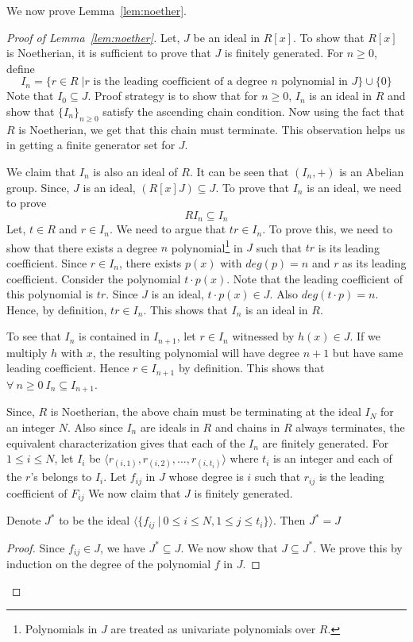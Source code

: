 We now prove Lemma~\ref{lem:noether}.
\begin{proof}[Proof of Lemma~\ref{lem:noether}]
Let, $J$ be an ideal in $R[x]$. To show that $R[x]$ is Noetherian, it is 
sufficient to prove that $J$ is finitely generated. 
For $n \ge 0$, define 
\[ I_n = \{r\in R\;| r \text{ is the leading coefficient of a degree } n
\text{ polynomial in } J\} \cup \{0\} \]
Note that $I_0 \subseteq J$. Proof strategy is to show that for $n \ge 0$,
$I_n$ is an ideal in $R$ and show that $\{I_n\}_{n \ge 0}$ satisfy the
ascending chain condition. Now using the fact that $R$ is Noetherian, we get
that this chain must terminate. This observation helps us in getting a finite 
generator set for $J$.

We claim that $I_n$ is also an ideal of $R$. It can be seen that $(I_n,+)$ is
an Abelian group. Since, $J$ is an ideal, $(R[x]J)\subseteq J$.
To prove that $I_n$ is an ideal, we need to prove $$RI_n\subseteq I_n$$
Let, $t\in R$ and $r \in I_n$. We need to argue that $tr\in I_n$. 
To prove this, we need to show that there exists a degree $n$
polynomial\footnote{Polynomials in $J$ are treated as univariate polynomials
over $R$.} in $J$ such that $tr$ is its leading coefficient.
Since $r\in I_n$, there exists $p(x)$ with $deg(p)=n$ and $r$ as its leading 
coefficient. Consider the polynomial $t\cdot p(x)$. Note that 
the leading coefficient of this polynomial is $tr$. Since $J$ is an ideal,
$t\cdot p(x)\in J$. Also $deg(t\cdot p) = n$. Hence, by definition, $tr\in
I_n$. This shows that $I_n$ is an ideal in $R$.

To see that $I_n$ is contained in $I_{n+1}$, let $r \in I_n$ witnessed by
$h(x) \in J$. If we multiply $h$ with $x$, the resulting polynomial will have 
degree $n+1$ but have same leading coefficient. Hence $r \in I_{n+1}$ by
definition. This shows that $\forall~n \ge 0~ I_n\subseteq I_{n+1}$. 

Since, $R$ is Noetherian, the above chain must be terminating at the ideal
$I_N$ for an integer $N$. Also since $I_n$ are ideals in $R$ and chains in $R$
always terminates, the equivalent characterization gives that each of the
$I_n$ are finitely generated. 
For $1 \le i \le N$, let $I_i$ be $ \langle
r_{(i,1)},r_{(i,2)},\ldots,r_{(i,t_i)} \rangle$ where $t_i$ is an integer
and each of the $r$'s belongs to $I_i$. Let $f_{ij}$ in $J$ whose degree 
is $i$ such that $r_{ij}$ is the leading coefficient of $F_{ij}$ 
We now claim that $J$ is finitely generated.
\begin{claim}
	Denote $J^*$ to be the ideal $\langle \{ f_{ij} ~|~ 0\leq i\leq N,
	1\leq j \leq t_i \}\rangle $. Then $J^* = J$
\end{claim}
\begin{proof}
	Since $f_{ij} \in J$, we have $J^*\subseteq J$. We now show that 
	$J\subseteq J^*$. We prove this by induction on the degree of 
	the polynomial $f$ in $J$.
	

\end{proof}
\end{proof}
